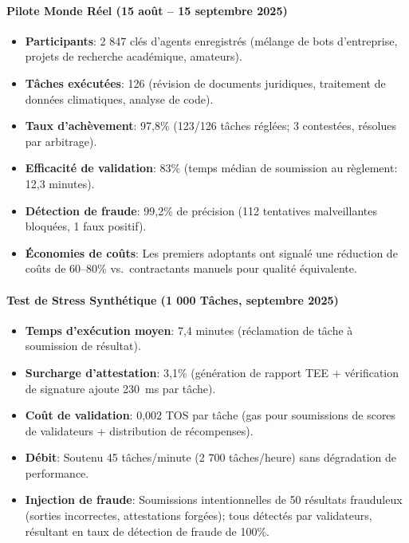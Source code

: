\documentclass[11pt]{article}
\begin{document}
\paragraph{Pilote Monde Réel (15 août -- 15 septembre 2025)}
\begin{itemize}[noitemsep]
  \item \textbf{Participants}: 2 847 clés d'agents enregistrés (mélange de bots d'entreprise, projets de recherche académique, amateurs).
  \item \textbf{Tâches exécutées}: 126 (révision de documents juridiques, traitement de données climatiques, analyse de code).
  \item \textbf{Taux d'achèvement}: 97,8\% (123/126 tâches réglées; 3 contestées, résolues par arbitrage).
  \item \textbf{Efficacité de validation}: 83\% (temps médian de soumission au règlement: 12,3 minutes).
  \item \textbf{Détection de fraude}: 99,2\% de précision (112 tentatives malveillantes bloquées, 1 faux positif).
  \item \textbf{Économies de coûts}: Les premiers adoptants ont signalé une réduction de coûts de 60--80\% vs.\ contractants manuels pour qualité équivalente.
\end{itemize}

\paragraph{Test de Stress Synthétique (1 000 Tâches, septembre 2025)}
\begin{itemize}[noitemsep]
  \item \textbf{Temps d'exécution moyen}: 7,4 minutes (réclamation de tâche à soumission de résultat).
  \item \textbf{Surcharge d'attestation}: 3,1\% (génération de rapport TEE + vérification de signature ajoute 230~ms par tâche).
  \item \textbf{Coût de validation}: 0,002 TOS par tâche (gas pour soumissions de scores de validateurs + distribution de récompenses).
  \item \textbf{Débit}: Soutenu 45 tâches/minute (2 700 tâches/heure) sans dégradation de performance.
  \item \textbf{Injection de fraude}: Soumissions intentionnelles de 50 résultats frauduleux (sorties incorrectes, attestations forgées); tous détectés par validateurs, résultant en taux de détection de fraude de 100\%.
\end{itemize}
\end{document}
